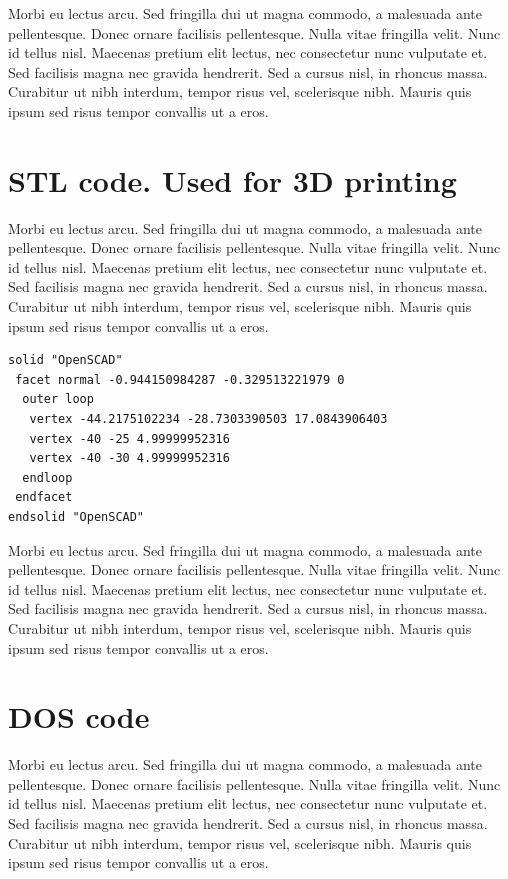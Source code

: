 Morbi eu lectus arcu. Sed fringilla dui ut magna commodo, a malesuada ante pellentesque. Donec ornare facilisis pellentesque. Nulla vitae fringilla velit. Nunc id tellus nisl. Maecenas pretium elit lectus, nec consectetur nunc vulputate et. Sed facilisis magna nec gravida hendrerit. Sed a cursus nisl, in rhoncus massa. Curabitur ut nibh interdum, tempor risus vel, scelerisque nibh. Mauris quis ipsum sed risus tempor convallis ut a eros.

\section{STL code. Used for 3D printing}

Morbi eu lectus arcu. Sed fringilla dui ut magna commodo, a malesuada ante pellentesque. Donec ornare facilisis pellentesque. Nulla vitae fringilla velit. Nunc id tellus nisl. Maecenas pretium elit lectus, nec consectetur nunc vulputate et. Sed facilisis magna nec gravida hendrerit. Sed a cursus nisl, in rhoncus massa. Curabitur ut nibh interdum, tempor risus vel, scelerisque nibh. Mauris quis ipsum sed risus tempor convallis ut a eros.

\begin{lstlisting}[language=STL, caption=STL example.]
solid "OpenSCAD"
 facet normal -0.944150984287 -0.329513221979 0
  outer loop
   vertex -44.2175102234 -28.7303390503 17.0843906403
   vertex -40 -25 4.99999952316
   vertex -40 -30 4.99999952316
  endloop
 endfacet
endsolid "OpenSCAD"

\end{lstlisting}

Morbi eu lectus arcu. Sed fringilla dui ut magna commodo, a malesuada ante pellentesque. Donec ornare facilisis pellentesque. Nulla vitae fringilla velit. Nunc id tellus nisl. Maecenas pretium elit lectus, nec consectetur nunc vulputate et. Sed facilisis magna nec gravida hendrerit. Sed a cursus nisl, in rhoncus massa. Curabitur ut nibh interdum, tempor risus vel, scelerisque nibh. Mauris quis ipsum sed risus tempor convallis ut a eros.

\section{DOS code}

Morbi eu lectus arcu. Sed fringilla dui ut magna commodo, a malesuada ante pellentesque. Donec ornare facilisis pellentesque. Nulla vitae fringilla velit. Nunc id tellus nisl. Maecenas pretium elit lectus, nec consectetur nunc vulputate et. Sed facilisis magna nec gravida hendrerit. Sed a cursus nisl, in rhoncus massa. Curabitur ut nibh interdum, tempor risus vel, scelerisque nibh. Mauris quis ipsum sed risus tempor convallis ut a eros.


